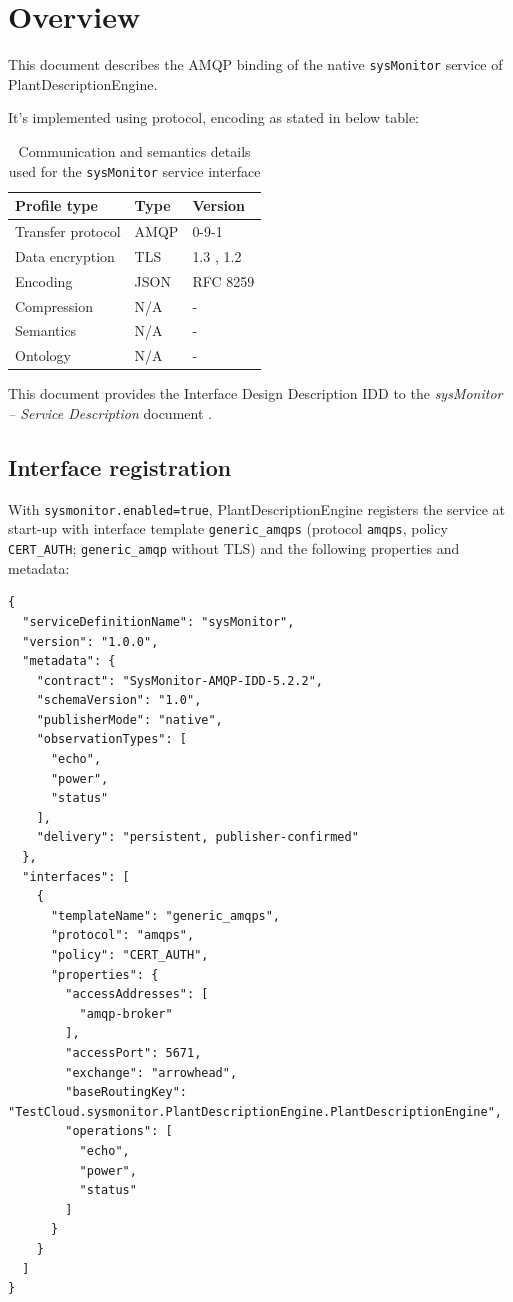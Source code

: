\documentclass[a4paper]{arrowhead}
\begin{document}
\section{Overview}
\label{sec:overview}

This document describes the AMQP binding of the native \texttt{sysMonitor} service of PlantDescriptionEngine.

It's implemented using protocol, encoding as stated in below table:
\begin{table}[ht!]
  \centering
  \begin{tabular}{|l|l|l|}
    \hline
    \rowcolor{gray!33} Profile type & Type & Version \\ \hline
    Transfer protocol & AMQP & 0-9-1 \cite{amqp091} \\ \hline
    Data encryption & TLS & 1.3 \cite{rfc8446}, 1.2 \cite{rfc5246} \\ \hline
    Encoding & JSON & RFC 8259 \cite{rfc8259} \\ \hline
    Compression & N/A & - \\ \hline
    Semantics & N/A & - \\ \hline
    Ontology & N/A & - \\ \hline
  \end{tabular}
  \caption{Communication and semantics details used for the \texttt{sysMonitor} service interface}
  \label{tab:comunication_semantics_profile}
\end{table}

This document provides the Interface Design Description IDD to the \textit{sysMonitor -- Service Description} document \cite{pde-sysMonitor-sd}.

\subsection{Interface registration}

With \texttt{sysmonitor.enabled=true}, PlantDescriptionEngine registers the service at start-up with interface template \texttt{generic\_\allowbreak{}amqps} (protocol \texttt{amqps}, policy \texttt{CERT\_\allowbreak{}AUTH}; \texttt{generic\_\allowbreak{}amqp} without TLS) and the following properties and metadata:

\begin{lstlisting}[caption={Registered service instance (TestCloud).}]
{
  "serviceDefinitionName": "sysMonitor",
  "version": "1.0.0",
  "metadata": {
    "contract": "SysMonitor-AMQP-IDD-5.2.2",
    "schemaVersion": "1.0",
    "publisherMode": "native",
    "observationTypes": [
      "echo",
      "power",
      "status"
    ],
    "delivery": "persistent, publisher-confirmed"
  },
  "interfaces": [
    {
      "templateName": "generic_amqps",
      "protocol": "amqps",
      "policy": "CERT_AUTH",
      "properties": {
        "accessAddresses": [
          "amqp-broker"
        ],
        "accessPort": 5671,
        "exchange": "arrowhead",
        "baseRoutingKey": "TestCloud.sysmonitor.PlantDescriptionEngine.PlantDescriptionEngine",
        "operations": [
          "echo",
          "power",
          "status"
        ]
      }
    }
  ]
}
\end{lstlisting}
\end{document}

